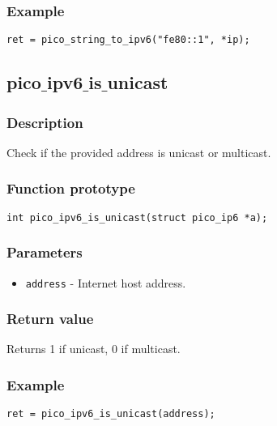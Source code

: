 \subsubsection*{Example}
\begin{verbatim}
ret = pico_string_to_ipv6("fe80::1", *ip);
\end{verbatim}

\subsection{pico$\_$ipv6$\_$is$\_$unicast}

\subsubsection*{Description}
Check if the provided address is unicast or multicast.

\subsubsection*{Function prototype}
\begin{verbatim}
int pico_ipv6_is_unicast(struct pico_ip6 *a);
\end{verbatim}

\subsubsection*{Parameters}
\begin{itemize}[noitemsep]
\item \texttt{address} - Internet host address.
\end{itemize}

\subsubsection*{Return value}
Returns 1 if unicast, 0 if multicast.


\subsubsection*{Example}
\begin{verbatim}
ret = pico_ipv6_is_unicast(address);
\end{verbatim}

